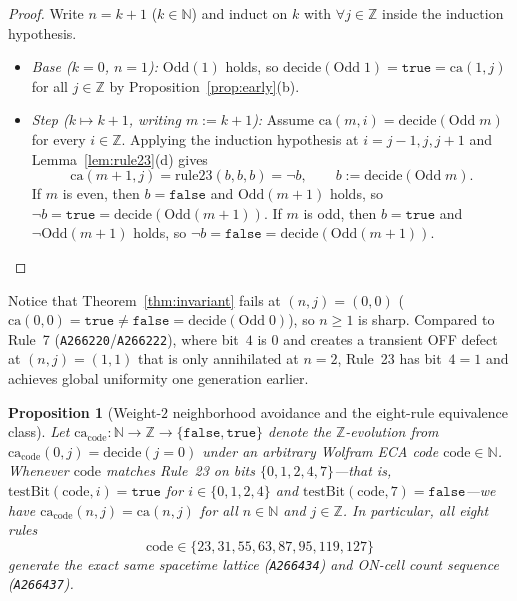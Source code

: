 \documentclass[11pt]{article}
\newtheorem{proposition}[theorem]{Proposition}
\theoremstyle{definition}
\newcommand{\N}{\mathbb{N}}
\newcommand{\Z}{\mathbb{Z}}
\newcommand{\seq}[1]{\texttt{#1}}
\newcommand{\ca}{\mathrm{ca}}
\newcommand{\ruleTwoThree}{\mathrm{rule23}}
\newcommand{\btrue}{\mathtt{true}}
\newcommand{\bfalse}{\mathtt{false}}
\begin{document}
\begin{proof}
Write $n = k + 1$ ($k \in \N$) and induct on $k$ with $\forall j \in \Z$ inside the induction hypothesis.
\begin{itemize}
\item \emph{Base ($k = 0$, $n = 1$):} $\mathrm{Odd}(1)$ holds, so $\mathrm{decide}(\mathrm{Odd}\; 1) = \btrue = \ca(1, j)$ for all $j \in \Z$ by Proposition~\ref{prop:early}(b).
\item \emph{Step ($k \mapsto k + 1$, writing $m := k + 1$):} Assume $\ca(m, i) = \mathrm{decide}(\mathrm{Odd}\; m)$ for every $i \in \Z$. Applying the induction hypothesis at $i = j - 1, j, j + 1$ and Lemma~\ref{lem:rule23}(d) gives
\[
\ca(m + 1, j) = \ruleTwoThree(b, b, b) = \neg b, \qquad b := \mathrm{decide}(\mathrm{Odd}\; m).
\]
If $m$ is even, then $b = \bfalse$ and $\mathrm{Odd}(m + 1)$ holds, so $\neg b = \btrue = \mathrm{decide}(\mathrm{Odd}(m + 1))$. If $m$ is odd, then $b = \btrue$ and $\neg\mathrm{Odd}(m + 1)$ holds, so $\neg b = \bfalse = \mathrm{decide}(\mathrm{Odd}(m + 1))$. \qedhere
\end{itemize}
\end{proof}

Notice that Theorem~\ref{thm:invariant} fails at $(n, j) = (0, 0)$ ($\ca(0, 0) = \btrue \ne \bfalse = \mathrm{decide}(\mathrm{Odd}\; 0)$), so $n \ge 1$ is sharp. Compared to Rule~7 (\seq{A266220}/\seq{A266222}), where bit~$4$ is $0$ and creates a transient OFF defect at $(n, j) = (1, 1)$ that is only annihilated at $n = 2$, Rule~23 has bit~$4 = 1$ and achieves global uniformity one generation earlier.

\begin{proposition}[Weight-$2$ neighborhood avoidance and the eight-rule equivalence class]
\label{prop:equiv-class}
Let $\ca_{\mathrm{code}} : \N \to \Z \to \{\bfalse, \btrue\}$ denote the $\Z$-evolution from $\ca_{\mathrm{code}}(0, j) = \mathrm{decide}(j = 0)$ under an arbitrary Wolfram ECA code $\mathrm{code} \in \N$. Whenever $\mathrm{code}$ matches Rule~23 on bits $\{0, 1, 2, 4, 7\}$---that is, $\mathrm{testBit}(\mathrm{code}, i) = \btrue$ for $i \in \{0, 1, 2, 4\}$ and $\mathrm{testBit}(\mathrm{code}, 7) = \bfalse$---we have $\ca_{\mathrm{code}}(n, j) = \ca(n, j)$ for all $n \in \N$ and $j \in \Z$. In particular, all eight rules
\[
\mathrm{code} \in \{23, 31, 55, 63, 87, 95, 119, 127\}
\]
generate the exact same spacetime lattice (\seq{A266434}) and ON-cell count sequence (\seq{A266437}).
\end{proposition}
\end{document}

